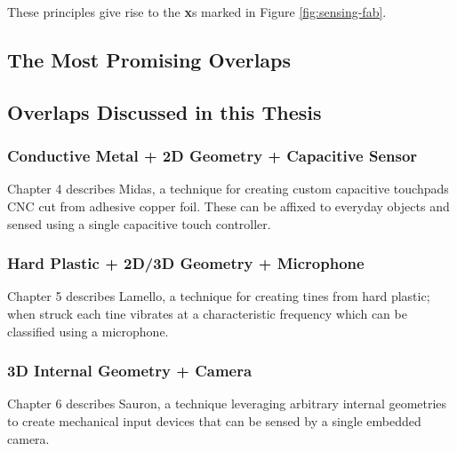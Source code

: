     These principles give rise to the \textbf{x}s marked in Figure \ref{fig:sensing-fab}.
    
\subsection{The Most Promising Overlaps}

    
\subsection{Overlaps Discussed in this Thesis}

    \subsubsection{Conductive Metal + 2D Geometry + Capacitive Sensor}
    
    Chapter 4 describes Midas, a technique for creating custom capacitive touchpads CNC cut from adhesive copper foil. These can be affixed to everyday objects and sensed using a single capacitive touch controller.
    
    \subsubsection{Hard Plastic + 2D/3D Geometry + Microphone}
    
    Chapter 5 describes Lamello, a technique for creating tines from hard plastic; when struck each tine vibrates at a characteristic frequency which can be classified using a microphone.
    
    \subsubsection{3D Internal Geometry + Camera}
    
    Chapter 6 describes Sauron, a technique leveraging arbitrary internal geometries to create mechanical input devices that can be sensed by a single embedded camera.